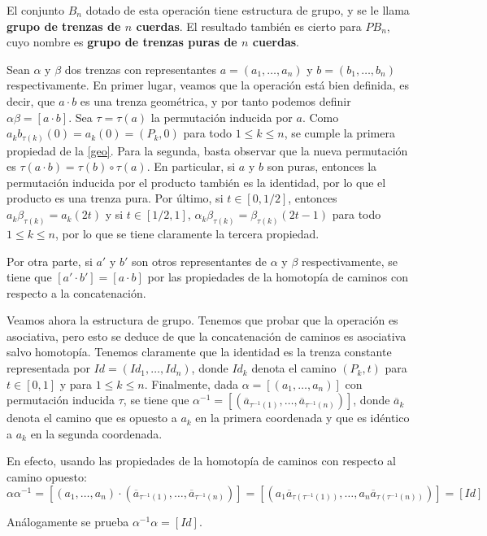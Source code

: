 \documentclass[bibtex, anon]{TEMat-article}
\begin{document}
\begin{proposicion}
	El conjunto $B_n$ dotado de esta operación tiene estructura de grupo, y se le llama \textbf{grupo de trenzas de $n$ cuerdas}. El resultado también es cierto para $PB_n$, cuyo nombre es \textbf{grupo de trenzas puras de $n$ cuerdas}. 
\end{proposicion}

\begin{demostracion}
	Sean $\alpha$ y $\beta$ dos trenzas con representantes $a=(a_1,\dots, a_n)$ y $b=(b_1,\dots, b_n)$ respectivamente. En primer lugar, veamos que la operación está bien definida, es decir, que $a\cdot b$ es una trenza geométrica, y por tanto podemos definir $\alpha\beta=[a\cdot b]$. Sea $\tau=\tau(a)$ la permutación inducida por $a$. Como $a_kb_{\tau(k)}(0)=a_k(0)=(P_k,0)$ para todo $1\leq k\leq n$, se cumple la primera propiedad de la \cref{geo}. Para la segunda, basta observar que la nueva permutación es $\tau(a\cdot b)=\tau(b)\circ \tau(a)$. En particular, si $a$ y $b$ son puras, entonces la permutación inducida por el producto también es la identidad, por lo que el producto es una trenza pura. Por último, si $t\in[0,1/2]$, entonces $a_k\beta_{\tau(k)}=a_k(2t)$ y si $t\in [1/2,1]$, $\alpha_k\beta_{\tau(k)}=\beta_{\tau(k)}(2t-1)$ para todo $1\leq k\leq n$, por lo que se tiene claramente la tercera propiedad. 
	
	Por otra parte, si $a'$ y $b'$ son otros representantes de $\alpha$ y $\beta$ respectivamente, se tiene que $[a'\cdot b']=[a\cdot b]$ por las propiedades de la homotopía de caminos con respecto a la concatenación.
	
	Veamos ahora la estructura de grupo. Tenemos que probar que la operación es asociativa, pero esto se deduce de que la concatenación de caminos es asociativa salvo homotopía.
	Tenemos claramente que la identidad es la trenza constante representada por $Id=(Id_1,\dots, Id_n)$, donde $Id_k$ denota el camino $(P_k, t)$ para $t\in[0,1]$ y para $1\leq k\leq n$.
	Finalmente, dada $\alpha=[(a_1,\dots, a_n)]$ con permutación inducida $\tau$, se tiene que $\alpha^{-1}=[(\overline{a}_{\tau^{-1}(1)},\dots, \overline{a}_{\tau^{-1}(n)})]$, donde $\overline{a}_k$ denota el camino que es opuesto a $a_k$ en la primera coordenada y que es idéntico a $a_k$ en la segunda coordenada. 
	
	En efecto, usando las propiedades de la homotopía de caminos con respecto al camino opuesto:
	\[
	\alpha\alpha^{-1}=[(a_1,\dots, a_n)\cdot (\overline{a}_{\tau^{-1}(1)},\dots, \overline{a}_{\tau^{-1}(n)})]=[(a_1\overline{a}_{\tau(\tau^{-1}(1))},\dots, a_n\overline{a}_{\tau(\tau^{-1}(n))})]=[Id]
	\]
	
	Análogamente se prueba $\alpha^{-1}\alpha=[Id]$. 
	
\end{demostracion}
\end{document}
